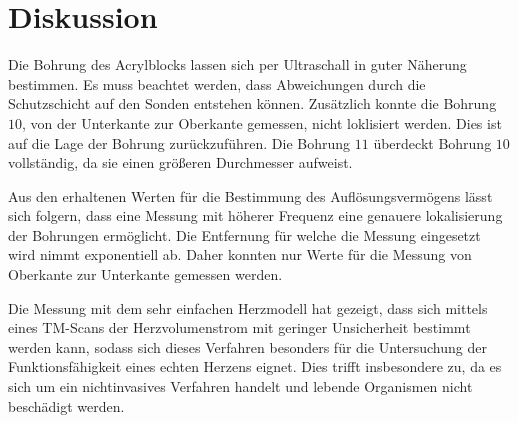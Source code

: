 \section{Diskussion}
\label{sec:Diskussion}
Die Bohrung des Acrylblocks lassen sich per Ultraschall in guter Näherung bestimmen.
Es muss beachtet werden, dass Abweichungen durch die Schutzschicht auf den Sonden entstehen können.
Zusätzlich konnte die Bohrung $10$, von der Unterkante zur Oberkante gemessen, nicht loklisiert werden.
Dies ist auf die Lage der Bohrung zurückzuführen.
Die Bohrung $11$ überdeckt Bohrung $10$ vollständig, da sie einen größeren Durchmesser aufweist.


\noindent Aus den erhaltenen Werten für die Bestimmung des Auflösungsvermögens lässt sich folgern,
dass eine Messung mit höherer Frequenz eine genauere lokalisierung der Bohrungen ermöglicht.
Die Entfernung für welche die Messung eingesetzt wird nimmt exponentiell ab.
Daher konnten nur Werte für die Messung von Oberkante zur Unterkante gemessen werden.


\noindent Die Messung mit dem sehr einfachen Herzmodell hat gezeigt, dass sich mittels eines TM-Scans der Herzvolumenstrom mit geringer Unsicherheit 
bestimmt werden kann, sodass sich dieses Verfahren besonders für die Untersuchung der Funktionsfähigkeit eines echten Herzens eignet.
Dies trifft insbesondere zu, da es sich um ein nichtinvasives Verfahren handelt und lebende Organismen nicht beschädigt werden.
